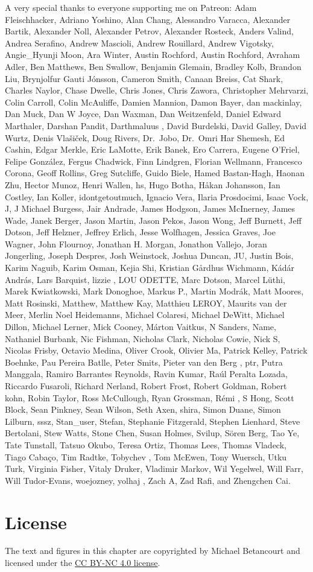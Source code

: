 \documentclass[
  letterpaper,
  DIV=11,
  numbers=noendperiod]{scrartcl}
\begin{document}
A very special thanks to everyone supporting me on Patreon: Adam
Fleischhacker, Adriano Yoshino, Alan Chang, Alessandro Varacca,
Alexander Bartik, Alexander Noll, Alexander Petrov, Alexander Rosteck,
Anders Valind, Andrea Serafino, Andrew Mascioli, Andrew Rouillard,
Andrew Vigotsky, Angie\_Hyunji Moon, Ara Winter, Austin Rochford, Austin
Rochford, Avraham Adler, Ben Matthews, Ben Swallow, Benjamin Glemain,
Bradley Kolb, Brandon Liu, Brynjolfur Gauti Jónsson, Cameron Smith,
Canaan Breiss, Cat Shark, Charles Naylor, Chase Dwelle, Chris Jones,
Chris Zawora, Christopher Mehrvarzi, Colin Carroll, Colin McAuliffe,
Damien Mannion, Damon Bayer, dan mackinlay, Dan Muck, Dan W Joyce, Dan
Waxman, Dan Weitzenfeld, Daniel Edward Marthaler, Darshan Pandit,
Darthmaluus , David Burdelski, David Galley, David Wurtz, Denis
Vlašiček, Doug Rivers, Dr.~Jobo, Dr.~Omri Har Shemesh, Ed Cashin, Edgar
Merkle, Eric LaMotte, Erik Banek, Ero Carrera, Eugene O'Friel, Felipe
González, Fergus Chadwick, Finn Lindgren, Florian Wellmann, Francesco
Corona, Geoff Rollins, Greg Sutcliffe, Guido Biele, Hamed Bastan-Hagh,
Haonan Zhu, Hector Munoz, Henri Wallen, hs, Hugo Botha, Håkan Johansson,
Ian Costley, Ian Koller, idontgetoutmuch, Ignacio Vera, Ilaria
Prosdocimi, Isaac Vock, J, J Michael Burgess, Jair Andrade, James
Hodgson, James McInerney, James Wade, Janek Berger, Jason Martin, Jason
Pekos, Jason Wong, Jeff Burnett, Jeff Dotson, Jeff Helzner, Jeffrey
Erlich, Jesse Wolfhagen, Jessica Graves, Joe Wagner, John Flournoy,
Jonathan H. Morgan, Jonathon Vallejo, Joran Jongerling, Joseph Despres,
Josh Weinstock, Joshua Duncan, JU, Justin Bois, Karim Naguib, Karim
Osman, Kejia Shi, Kristian Gårdhus Wichmann, Kádár András, Lars
Barquist, lizzie , LOU ODETTE, Marc Dotson, Marcel Lüthi, Marek
Kwiatkowski, Mark Donoghoe, Markus P., Martin Modrák, Matt Moores, Matt
Rosinski, Matthew, Matthew Kay, Matthieu LEROY, Maurits van der Meer,
Merlin Noel Heidemanns, Michael Colaresi, Michael DeWitt, Michael
Dillon, Michael Lerner, Mick Cooney, Márton Vaitkus, N Sanders, Name,
Nathaniel Burbank, Nic Fishman, Nicholas Clark, Nicholas Cowie, Nick S,
Nicolas Frisby, Octavio Medina, Oliver Crook, Olivier Ma, Patrick
Kelley, Patrick Boehnke, Pau Pereira Batlle, Peter Smits, Pieter van den
Berg , ptr, Putra Manggala, Ramiro Barrantes Reynolds, Ravin Kumar, Raúl
Peralta Lozada, Riccardo Fusaroli, Richard Nerland, Robert Frost, Robert
Goldman, Robert kohn, Robin Taylor, Ross McCullough, Ryan Grossman, Rémi
, S Hong, Scott Block, Sean Pinkney, Sean Wilson, Seth Axen, shira,
Simon Duane, Simon Lilburn, sssz, Stan\_user, Stefan, Stephanie
Fitzgerald, Stephen Lienhard, Steve Bertolani, Stew Watts, Stone Chen,
Susan Holmes, Svilup, Sören Berg, Tao Ye, Tate Tunstall, Tatsuo Okubo,
Teresa Ortiz, Thomas Lees, Thomas Vladeck, Tiago Cabaço, Tim Radtke,
Tobychev , Tom McEwen, Tony Wuersch, Utku Turk, Virginia Fisher, Vitaly
Druker, Vladimir Markov, Wil Yegelwel, Will Farr, Will Tudor-Evans,
woejozney, yolhaj , Zach A, Zad Rafi, and Zhengchen Cai.

\section*{License}\label{license}

The text and figures in this chapter are copyrighted by Michael
Betancourt and licensed under the
\href{https://creativecommons.org/licenses/by-nc/4.0/}{CC BY-NC 4.0
license}.
\end{document}
